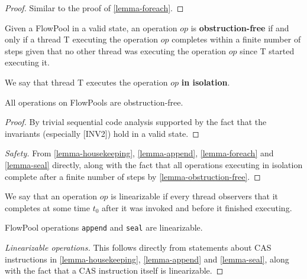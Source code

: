 \documentclass[runningheads,a4paper]{llncs}
\begin{document}
\begin{proof}
Similar to the proof of \ref{lemma-foreach}.
\end{proof}


\begin{definition}
Given a FlowPool in a valid state, an operation $op$ is
\textbf{obstruction-free} if and only if a thread T executing the
operation $op$ completes within a finite number of steps given that
no other thread was executing the operation $op$ since T started executing it.

We say that thread T executes the operation $op$ \textbf{in isolation}.
\end{definition}


\begin{lemma}\label{lemma-obstruction-free}
All operations on FlowPools are obstruction-free.
\end{lemma}

\begin{proof}
By trivial sequential code analysis supported by the fact that the
invariants (especially [INV2]) hold in a valid state.
\end{proof}


\begin{proof}[Safety]
From \ref{lemma-housekeeping}, \ref{lemma-append}, \ref{lemma-foreach} and
\ref{lemma-seal} directly, along with the fact that all operations
executing in isolation complete after a finite number of steps by \ref{lemma-obstruction-free}.
\end{proof}


\begin{definition}[Linearizability]
We say that an operation $op$ is linearizable if every thread
observers that it completes at some time $t_0$ after it was invoked
and before it finished executing.
\end{definition}


\begin{theorem}
FlowPool operations \verb=append= and \verb=seal= are linearizable.
\end{theorem}

\begin{proof}[Linearizable operations]
This follows directly from statements about CAS instructions in \ref{lemma-housekeeping},
\ref{lemma-append} and \ref{lemma-seal}, along with the fact that a
CAS instruction itself is linearizable.
\end{proof}
\end{document}
